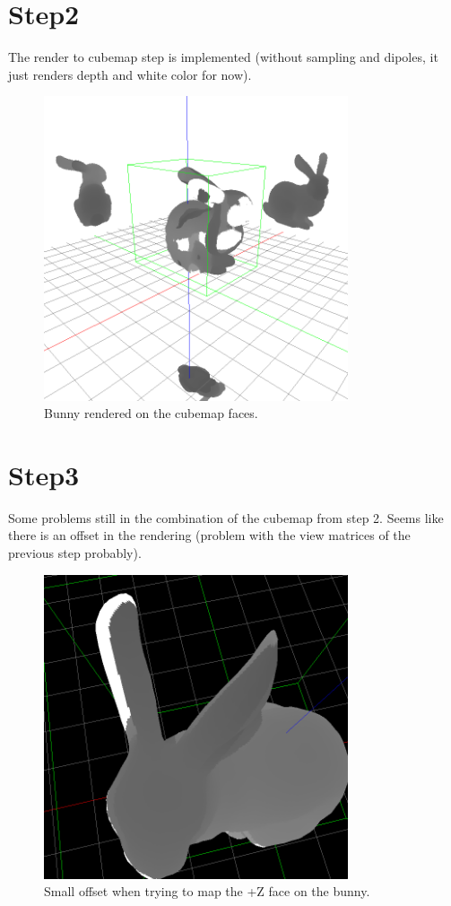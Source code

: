 \documentclass[12pt, twoside,a4paper]{article}
\begin{document}
\section{Step2}
The render to cubemap step is implemented (without sampling and dipoles, it just renders depth and white color for now). 

\vspace{1cm}

\begin{figure}[here]
\centering
\includegraphics[width=0.8\textwidth]{cubemap}
\caption{Bunny rendered on the cubemap faces.}
\end{figure}

\clearpage
\section{Step3}
Some problems still in the combination of the cubemap from step 2. Seems like there is an offset in the rendering (problem with the view matrices of the previous step probably).

\vspace{1cm}

\begin{figure}[here]
\centering
\includegraphics[width=0.8\textwidth]{offset}
\caption{Small offset when trying to map the +Z face on the bunny.}
\end{figure}
\end{document}
